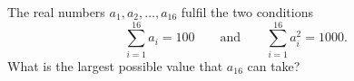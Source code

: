 The real numbers $a_1,a_2,\ldots,a_{16}$ fulfil the two conditions
$$\sum_{i=1}^{16} a_i =100 \qquad \text{and} \qquad \sum_{i=1}^{16} a_i^2=1000.$$
What is the largest possible value that $a_{16}$ can take?
